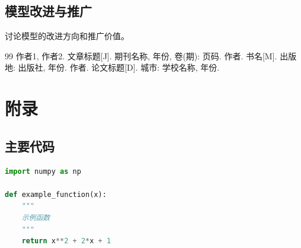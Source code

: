 \documentclass[12pt,a4paper]{article}
\begin{document}
\subsection{模型改进与推广}
讨论模型的改进方向和推广价值。

\begin{thebibliography}{99}
 作者1, 作者2. 文章标题[J]. 期刊名称, 年份, 卷(期): 页码.
 作者. 书名[M]. 出版地: 出版社, 年份.
 作者. 论文标题[D]. 城市: 学校名称, 年份.
\end{thebibliography}

\newpage
\appendix
\section{附录}

\subsection{主要代码}

\begin{lstlisting}[language=Python, caption=示例代码]
import numpy as np

def example_function(x):
    """
    示例函数
    """
    return x**2 + 2*x + 1
\end{lstlisting}
\end{document}
